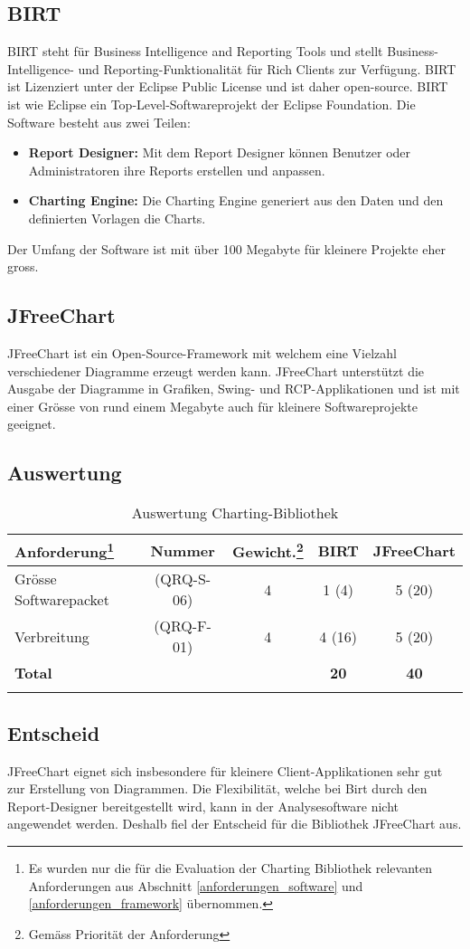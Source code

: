 \subsection{BIRT}
BIRT steht für Business Intelligence and Reporting Tools und stellt Business-Intelligence- und Reporting-Funktionalität für Rich Clients zur Verfügung. BIRT ist Lizenziert unter der Eclipse Public License und ist daher open-source. BIRT ist wie Eclipse ein Top-Level-Softwareprojekt der Eclipse Foundation. Die Software besteht aus zwei Teilen:
\begin{itemize}
\item \textbf{Report Designer: }Mit dem Report Designer können Benutzer oder Administratoren ihre Reports erstellen und anpassen. 
\item \textbf{Charting Engine: }Die Charting Engine generiert aus den Daten und den definierten Vorlagen die Charts.
\end{itemize} 

Der Umfang der Software ist mit über 100 Megabyte für kleinere Projekte eher gross.

\subsection{JFreeChart}
JFreeChart ist ein Open-Source-Framework mit welchem eine Vielzahl verschiedener Diagramme erzeugt werden kann. JFreeChart unterstützt die Ausgabe der Diagramme in Grafiken, Swing- und RCP-Applikationen und ist mit einer Grösse von rund einem Megabyte auch für kleinere Softwareprojekte geeignet.

\subsection{Auswertung}
\begin{longtable}{|p{4cm}|c|c|c|c|}\hline
 \textbf{Anforderung\footnote{Es wurden nur die für die Evaluation der Charting Bibliothek relevanten Anforderungen aus Abschnitt \ref{anforderungen_software} und \ref{anforderungen_framework} übernommen.}} & \textbf{Nummer} &  \textbf{Gewicht.\footnote{Gemäss Priorität der Anforderung}} & \textbf{BIRT} & \textbf{JFreeChart}\\\hline
   Grösse Softwarepacket & (QRQ-S-06) & 4 & 1 (4) & 5 (20) \\\hline
   Verbreitung & (QRQ-F-01) & 4 & 4 (16) & 5 (20) \\\hline
   \textbf{Total} & && \textbf{20}  & \textbf{40} \\\hline
    \caption{Auswertung Charting-Bibliothek}
\end{longtable}

\subsection{Entscheid}
JFreeChart eignet sich insbesondere für kleinere Client-Applikationen sehr gut zur Erstellung von Diagrammen. Die Flexibilität, welche bei Birt durch den Report-Designer bereitgestellt wird, kann in der Analysesoftware nicht angewendet werden. Deshalb fiel der Entscheid für die Bibliothek JFreeChart aus.
